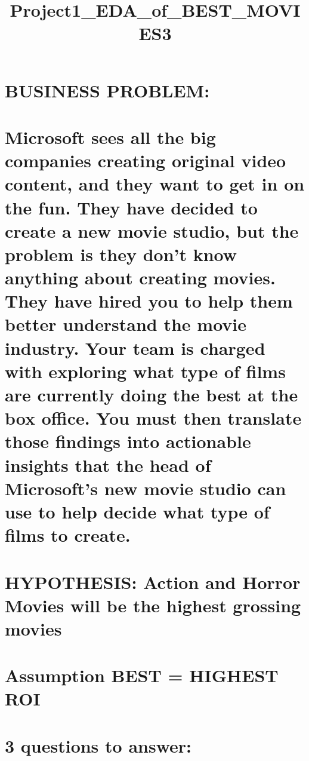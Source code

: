 \documentclass[11pt]{article}
\title{Project1\_EDA\_of\_BEST\_MOVIES3}
\begin{document}
    
    
    \maketitle
    
    

    
    \section{BUSINESS PROBLEM:}\label{business-problem}

\section{Microsoft sees all the big companies creating original video
content, and they want to get in on the fun. They have decided to create
a new movie studio, but the problem is they don't know anything about
creating movies. They have hired you to help them better understand the
movie industry. Your team is charged with exploring what type of films
are currently doing the best at the box office. You must then translate
those findings into actionable insights that the head of Microsoft's new
movie studio can use to help decide what type of films to
create.}\label{microsoft-sees-all-the-big-companies-creating-original-video-content-and-they-want-to-get-in-on-the-fun.-they-have-decided-to-create-a-new-movie-studio-but-the-problem-is-they-dont-know-anything-about-creating-movies.-they-have-hired-you-to-help-them-better-understand-the-movie-industry.-your-team-is-charged-with-exploring-what-type-of-films-are-currently-doing-the-best-at-the-box-office.-you-must-then-translate-those-findings-into-actionable-insights-that-the-head-of-microsofts-new-movie-studio-can-use-to-help-decide-what-type-of-films-to-create.}

    \section{HYPOTHESIS: Action and Horror Movies will be the highest
grossing
movies}\label{hypothesis-action-and-horror-movies-will-be-the-highest-grossing-movies}

    \section{Assumption BEST = HIGHEST
ROI}\label{assumption-best-highest-roi}

    \section{3 questions to answer:}\label{questions-to-answer}
\end{document}
